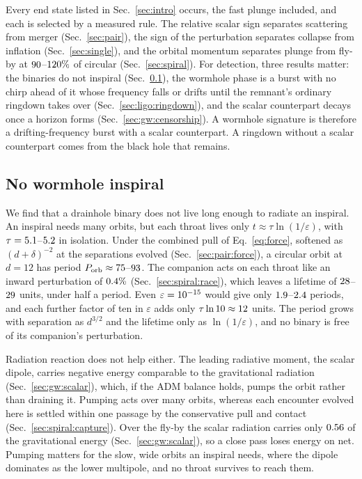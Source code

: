 \documentclass[twocolumn,floatfix,aps,prd,superscriptaddress,nofootinbib]{revtex4-2}
\begin{document}
Every end state listed in Sec.~\ref{sec:intro} occurs, the fast plunge included, and each is selected by a measured rule. The relative scalar sign separates scattering from merger (Sec.~\ref{sec:pair}), the sign of the perturbation separates collapse from inflation (Sec.~\ref{sec:single}), and the orbital momentum separates plunge from fly-by at $90$--$120\%$ of circular (Sec.~\ref{sec:spiral}). For detection, three results matter: the binaries do not inspiral (Sec.~\ref{sec:discussion:noinspiral}), the wormhole phase is a burst with no chirp ahead of it whose frequency falls or drifts until the remnant's ordinary ringdown takes over (Sec.~\ref{sec:ligo:ringdown}), and the scalar counterpart decays once a horizon forms (Sec.~\ref{sec:gw:censorship}). A wormhole signature is therefore a drifting-frequency burst with a scalar counterpart. A ringdown without a scalar counterpart comes from the black hole that remains.

\subsection{No wormhole inspiral}
\label{sec:discussion:noinspiral}

We find that a drainhole binary does not live long enough to radiate an inspiral. An inspiral needs many orbits, but each throat lives only $t\approx\tau\ln(1/\varepsilon)$, with $\tau=5.1$--$5.2$ in isolation. Under the combined pull of Eq.~\eqref{eq:force}, softened as $(d+\delta)^{-2}$ at the separations evolved (Sec.~\ref{sec:pair:force}), a circular orbit at $d=12$ has period $P_{\rm orb}\approx75$--$93$. The companion acts on each throat like an inward perturbation of $0.4\%$ (Sec.~\ref{sec:spiral:race}), which leaves a lifetime of $28$--$29$ units, under half a period. Even $\varepsilon=10^{-15}$ would give only $1.9$--$2.4$ periods, and each further factor of ten in $\varepsilon$ adds only $\tau\ln10\approx12$ units. The period grows with separation as $d^{3/2}$ and the lifetime only as $\ln(1/\varepsilon)$, and no binary is free of its companion's perturbation.

Radiation reaction does not help either. The leading radiative moment, the scalar dipole, carries negative energy comparable to the gravitational radiation (Sec.~\ref{sec:gw:scalar}), which, if the ADM balance holds, pumps the orbit rather than draining it. Pumping acts over many orbits, whereas each encounter evolved here is settled within one passage by the conservative pull and contact (Sec.~\ref{sec:spiral:capture}). Over the fly-by the scalar radiation carries only $0.56$ of the gravitational energy (Sec.~\ref{sec:gw:scalar}), so a close pass loses energy on net. Pumping matters for the slow, wide orbits an inspiral needs, where the dipole dominates as the lower multipole, and no throat survives to reach them.
\end{document}
